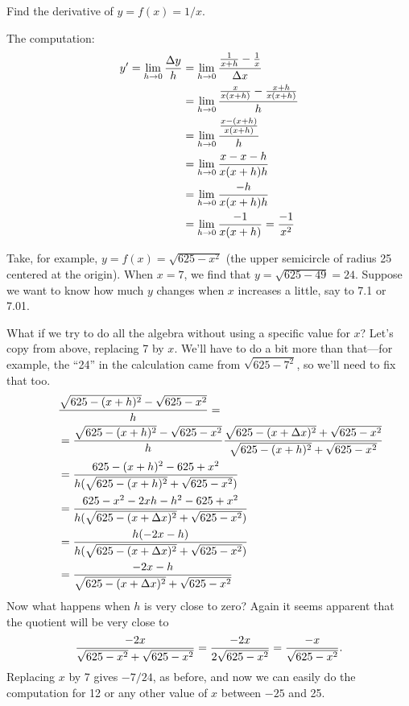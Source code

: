 \begin{example}

Find the derivative of $y=f(x)=1/x$.

The computation:
\begin{align*}
y' = \lim_{h\to0}{\Delta y\over h}&=
\lim_{ h\to0}{ {1\over x+ h} - {1\over x}\over \Delta
  x} \\
&=\lim_{ h\to0}{ {x\over x(x+ h)} - 
{x+ h\over x(x+ h)}\over  h} \\
&=\lim_{ h\to0}{ {x-(x+ h)\over x(x+ h)}\over  h} \\
&=\lim_{ h\to0} {x-x- h\over x(x+ h) h} \\
&=\lim_{ h\to0} {- h\over x(x+ h) h} \\
&=\lim_{ h\to0} {-1\over x(x+ h)}={-1\over x^2} \\
\end{align*}
\vskip-10pt
\end{example}









Take, for example, $y=f(x)=\sqrt{625-x^2}$ (the upper semicircle of radius
25 centered at the origin).  When $x=7$, we find that $y=\sqrt{625-49}=24$.
Suppose we want to know how much $y$ changes when $x$ increases a little,
say to 7.1 or 7.01.


What if we try to do all the algebra without using a specific
value for $x$? Let's copy from above, replacing 7 by  $x$. We'll have
to do a bit more than that---for example, 
the ``24'' in the calculation came from 
$\sqrt{625-7^2}$, so we'll need to fix that too.
\begin{align*}
&{\sqrt{625-(x+ h)^2} - \sqrt{625-x^2}\over  h}= \\
\qquad&={\sqrt{625-(x+ h)^2} - \sqrt{625-x^2}\over  h}{\sqrt{625-(x+\Delta
    x)^2}+\sqrt{625-x^2}\over \sqrt{625-(x+ h)^2}+\sqrt{625-x^2}} \\
&={625-(x+ h)^2-625+x^2\over  h(\sqrt{625-(x+ h)^2}+\sqrt{625-x^2})} \\
&={625-x^2-2x h- h^2-625+x^2\over   h(\sqrt{625-(x+\Delta
    x)^2}+\sqrt{625-x^2})} \\
&={ h(-2x- h)\over  h(\sqrt{625-(x+\Delta
    x)^2}+\sqrt{625-x^2})} \\
&= {-2x- h\over\sqrt{625-(x+\Delta
    x)^2}+\sqrt{625-x^2}} \\
\end{align*}
Now what happens when $h$ is very close to zero? Again it seems
apparent that the quotient will be very close to
$${-2x\over \sqrt{625-x^2}+\sqrt{625-x^2}}
={-2x\over 2\sqrt{625-x^2}}={-x\over \sqrt{625-x^2}}.
$$
Replacing $x$ by 7 gives $-7/24$, as before, and now we can easily do
the computation for 12  or any other value of
$x$ between $-25$ and 25.

